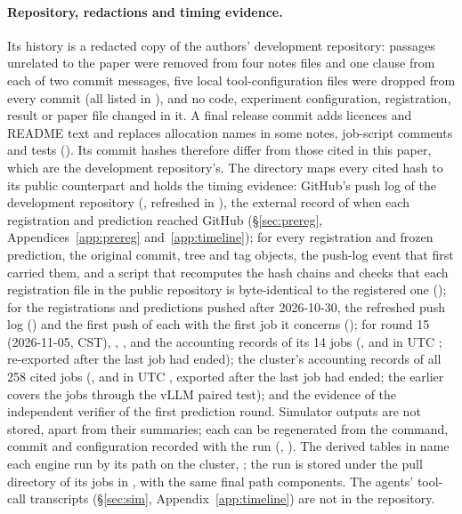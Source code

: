 \paragraph{Repository, redactions and timing evidence.} Its history is a redacted copy of the authors' development repository: passages unrelated to the paper were removed from four notes files and one clause from each of two commit messages, five local tool-configuration files were dropped from every commit (all listed in ), and no code, experiment configuration, registration, result or paper file changed in it. A final release commit adds licences and README text and replaces allocation names in some notes, job-script comments and tests (). Its commit hashes therefore differ from those cited in this paper, which are the development repository's. The directory  maps every cited hash to its public counterpart and holds the timing evidence: GitHub's push log of the development repository (, refreshed in ), the external record of when each registration and prediction reached GitHub (\S\ref{sec:prereg}, Appendices~\ref{app:prereg} and~\ref{app:timeline}); for every registration and frozen prediction, the original commit, tree and tag objects, the push-log event that first carried them, and a script that recomputes the hash chains and checks that each registration file in the public repository is byte-identical to the registered one (); for the registrations and predictions pushed after 2026-10-30, the refreshed push log () and the first push of each with the first job it concerns (); for round 15 (2026-11-05, CST), , ,  and the accounting records of its 14 jobs (, and in UTC ; re-exported after the last job had ended); the cluster's accounting records of all 258 cited jobs (, and in UTC , exported after the last job had ended; the earlier  covers the jobs through the vLLM paired test); and the evidence of the independent verifier of the first prediction round. Simulator outputs are not stored, apart from their summaries; each can be regenerated from the command, commit and configuration recorded with the run (, ). The derived tables in  name each engine run by its path on the cluster, ; the run is stored under the pull directory of its jobs in , with the same final path components. The agents' tool-call transcripts (\S\ref{sec:sim}, Appendix~\ref{app:timeline}) are not in the repository.

